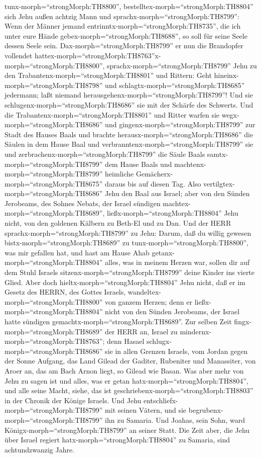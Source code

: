 tunx-morph=``strongMorph:TH8800'',
bestelltex-morph=``strongMorph:TH8804'' sich Jehu außen achtzig Mann und
sprachx-morph=``strongMorph:TH8799'': Wenn der Männer jemand
entrinntx-morph=``strongMorph:TH8735'', die ich unter eure Hände
gebex-morph=``strongMorph:TH8688'', so soll für seine Seele dessen Seele
sein.  Dax-morph=``strongMorph:TH8799'' er nun die
Brandopfer vollendet
hattex-morph=``strongMorph:TH8763''x-morph=``strongMorph:TH8800'',
sprachx-morph=``strongMorph:TH8799'' Jehu zu den
Trabantenx-morph=``strongMorph:TH8801'' und Rittern: Geht
hineinx-morph=``strongMorph:TH8798'' und
schlagtx-morph=``strongMorph:TH8685'' jedermann; laßt niemand
herausgehenx-morph=``strongMorph:TH8799''! Und sie
schlugenx-morph=``strongMorph:TH8686'' sie mit der Schärfe des Schwerts.
Und die Trabantenx-morph=``strongMorph:TH8801'' und Ritter warfen sie
wegx-morph=``strongMorph:TH8686'' und
gingenx-morph=``strongMorph:TH8799'' zur Stadt des Hauses Baals
 und brachte herausx-morph=``strongMorph:TH8686'' die
Säulen in dem Hause Baal und verbranntenx-morph=``strongMorph:TH8799''
sie  und zerbrachenx-morph=``strongMorph:TH8799'' die Säule
Baals samtx-morph=``strongMorph:TH8799'' dem Hause Baals und
machtenx-morph=``strongMorph:TH8799'' heimliche
Gemächerx-morph=``strongMorph:TH8675'' daraus bis auf diesen Tag.
 Also vertilgtex-morph=``strongMorph:TH8686'' Jehu den Baal
aus Israel;  aber von den Sünden Jerobeams, des Sohnes
Nebats, der Israel sündigen machtex-morph=``strongMorph:TH8689'',
ließx-morph=``strongMorph:TH8804'' Jehu nicht, von den goldenen Kälbern
zu Beth-El und zu Dan.  Und der HERR
sprachx-morph=``strongMorph:TH8799'' zu Jehu: Darum, daß du willig
gewesen bistx-morph=``strongMorph:TH8689'' zu
tunx-morph=``strongMorph:TH8800'', was mir gefallen hat, und hast am
Hause Ahab getanx-morph=``strongMorph:TH8804'' alles, was in meinem
Herzen war, sollen dir auf dem Stuhl Israels
sitzenx-morph=``strongMorph:TH8799'' deine Kinder ins vierte Glied.
 Aber doch hieltx-morph=``strongMorph:TH8804'' Jehu nicht,
daß er im Gesetz des HERRN, des Gottes Israels,
wandeltex-morph=``strongMorph:TH8800'' von ganzem Herzen; denn er
ließx-morph=``strongMorph:TH8804'' nicht von den Sünden Jerobeams, der
Israel hatte sündigen gemachtx-morph=``strongMorph:TH8689''.
 Zur selben Zeit fingx-morph=``strongMorph:TH8689'' der
HERR an, Israel zu mindernx-morph=``strongMorph:TH8763''; denn Hasael
schlugx-morph=``strongMorph:TH8686'' sie in allen Grenzen Israels,
 vom Jordan gegen der Sonne Aufgang, das Land Gilead der
Gaditer, Rubeniter und Manassiter, von Aroer an, das am Bach Arnon
liegt, so Gilead wie Basan.  Was aber mehr von Jehu zu
sagen ist und alles, was er getan hatx-morph=``strongMorph:TH8804'', und
alle seine Macht, siehe, das ist
geschriebenx-morph=``strongMorph:TH8803'' in der Chronik der Könige
Israels.  Und Jehu entschliefx-morph=``strongMorph:TH8799''
mit seinen Vätern, und sie begrubenx-morph=``strongMorph:TH8799'' ihn zu
Samaria. Und Joahas, sein Sohn, ward Königx-morph=``strongMorph:TH8799''
an seiner Statt.  Die Zeit aber, die Jehu über Israel
regiert hatx-morph=``strongMorph:TH8804'' zu Samaria, sind
achtundzwanzig Jahre.

